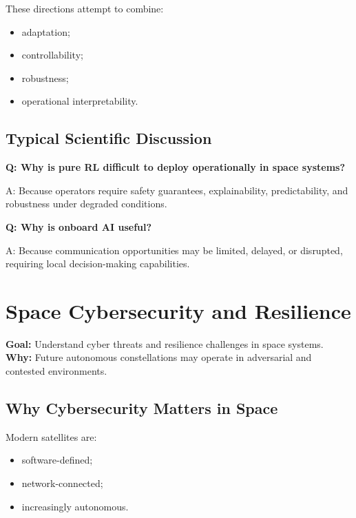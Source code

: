 \documentclass[10pt,a4paper,twocolumn]{article}
\newcommand{\lesson}[3]{
\section{#1}
\noindent
\textbf{Goal:} #2 \newline
\textbf{Why:} #3
\vspace{0.1em}
}
\begin{document}
These directions attempt to combine:
\begin{itemize}
    \item adaptation;
    \item controllability;
    \item robustness;
    \item operational interpretability.
\end{itemize}


\subsection{Typical Scientific Discussion}

\begin{questionbox}
    \textbf{Q: Why is pure RL difficult to deploy operationally in space systems?}

    A: Because operators require safety guarantees, explainability, predictability, and robustness under degraded conditions.
\end{questionbox}

\begin{questionbox}
    \textbf{Q: Why is onboard AI useful?}

    A: Because communication opportunities may be limited, delayed, or disrupted, requiring local decision-making capabilities.
\end{questionbox}



\lesson
{Space Cybersecurity and Resilience}
{Understand cyber threats and resilience challenges in space systems.}
{Future autonomous constellations may operate in adversarial and contested environments.}


\subsection{Why Cybersecurity Matters in Space}

Modern satellites are:
\begin{itemize}
    \item software-defined;
    \item network-connected;
    \item increasingly autonomous.
\end{itemize}
\end{document}
